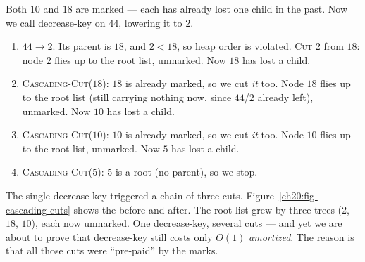 Both $10$ and $18$ are marked --- each has already lost one child in the past. Now
we call decrease-key on $44$, lowering it to $2$.

\begin{enumerate}
  \item $44 \to 2$. Its parent is $18$, and $2 < 18$, so heap order is violated.
        \textsc{Cut} $2$ from $18$: node $2$ flies up to the root list, unmarked.
        Now $18$ has lost a child.
  \item \textsc{Cascading-Cut}($18$): $18$ is already marked, so we cut \emph{it}
        too. Node $18$ flies up to the root list (still carrying nothing now, since
        $44$/$2$ already left), unmarked. Now $10$ has lost a child.
  \item \textsc{Cascading-Cut}($10$): $10$ is already marked, so we cut \emph{it}
        too. Node $10$ flies up to the root list, unmarked. Now $5$ has lost a
        child.
  \item \textsc{Cascading-Cut}($5$): $5$ is a root (no parent), so we stop.
\end{enumerate}

The single decrease-key triggered a chain of three cuts. Figure~\ref{ch20:fig-cascading-cuts}
shows the before-and-after. The root list grew by three trees ($2$, $18$, $10$),
each now unmarked. One decrease-key, several cuts --- and yet we are about to prove
that decrease-key still costs only $O(1)$ \emph{amortized}. The reason is that all
those cuts were ``pre-paid'' by the marks.

